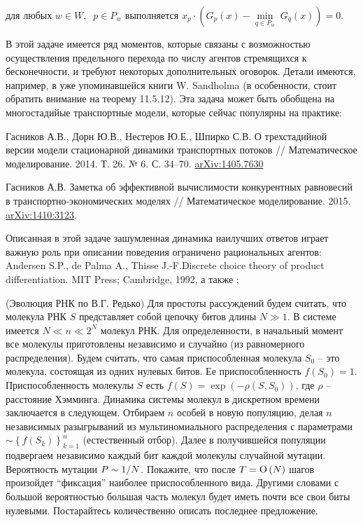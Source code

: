 \begin{problem} 
\begin{remark}
\begin{center}
для любых $w\in W,\;\;p\in P_w $ выполняется $x_p \cdot \left( {G_p \left( x 
\right)-\mathop {\min }\limits_{q\in P_w } \;G_q \left( x \right)} 
\right)=0.$
\end{center}

В этой задаче имеется ряд моментов, которые связаны с возможностью 
осуществления предельного перехода по числу агентов стремящихся к 
бесконечности, и требуют некоторых дополнительных оговорок. Детали имеются, 
например, в уже упоминавшейся книги W. Sandholma \cite{222} (в особенности, стоит 
обратить внимание на теорему 11.5.12). Эта задача может быть обобщена на 
многостадийые транспортные модели, которые сейчас популярны на практике:

{Гасников А.В., Дорн Ю.В., Нестеров Ю.Е., Шпирко С.В. }О трехстадийной версии модели стационарной динамики транспортных потоков // 
Математическое моделирование. 2014. Т. 26. № 6. С. 34--70. \underline 
{arXiv:1405.7630}

Гасников А.В. Заметка об эффективной вычислимости конкурентных равновесий в 
транспортно-экономических моделях // Математическое моделирование. 2015. 
\underline{arXiv:1410:3123}.

Описанная в этой задаче зашумленная динамика наилучших ответов играет важную 
роль при описании поведения ограничено рациональных агентов: Andersen S.P., de Palma A., Thisse J.-F.Discrete choice theory of product differentiation. MIT Press; Cambridge, 
1992, а также \cite{222};

\end{remark}

\end{problem}


\begin{problem}\Star(Эволюция РНК по В.Г. Редько)
Для простоты рассуждений 
будем считать, что молекула РНК $S$ представляет собой цепочку битов длины 
$N\gg 1$. В системе имеется $N\ll n\ll 2^N$ молекул РНК. Для определенности, 
в начальный момент все молекулы приготовлены независимо и случайно (из 
равномерного распределения). Будем считать, что самая приспособленная 
молекула $S_0 $ -- это молекула, состоящая из одних нулевых битов. Ее 
приспособленность $f\left( {S_0 } \right)=1$. Приспособленность молекулы $S$ 
есть $f\left( S \right)=\exp \left( {-\rho \left( {S,S_0 } \right)} \right)$, 
где $\rho $ -- расстояние Хэмминга. Динамика системы молекул в дискретном 
времени заключается в следующем. Отбираем $n$ особей в новую популяцию, 
делая $n$ независимых разыгрываний из мультиномиального распределения с 
параметрами $\sim \left\{ {f\left( {S_k } \right)} \right\}_{k=1}^n $ 
(естественный отбор). Далее в получившейся популяции подвергаем независимо 
каждый бит каждой молекулы случайной мутации. Вероятность мутации $P\sim 1 
\mathord{\left/ {\vphantom {1 N}} \right. \kern-\nulldelimiterspace} N$. 
Покажите, что после $T={\rm O}\left( N \right)$ шагов произойдет 
``фиксация'' наиболее приспособленного вида. Другими словами с большой 
вероятностью большая часть молекул будет иметь почти все свои биты нулевыми. 
Постарайтесь количественно описать последнее предложение.
\end{problem}

